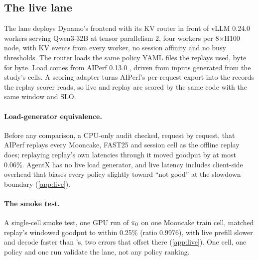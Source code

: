 \subsection{The live lane}
\label{sec:live-lane}

The lane deploys Dynamo's frontend with its KV router in front of vLLM 0.24.0 workers serving
Qwen3-32B at tensor parallelism 2, four workers per 8$\times$H100 node, with KV events from every
worker, no session affinity and no busy thresholds. The router loads the same policy YAML files the
replays used, byte for byte. Load comes from AIPerf 0.13.0 \citep{aiperf}, driven from inputs
generated from the study's cells. A scoring adapter turns AIPerf's per-request export into the
records the replay scorer reads, so live and replay are scored by the same code with the same window
and SLO.

\paragraph{Load-generator equivalence.}
Before any comparison, a CPU-only audit checked, request by request, that AIPerf replays every
Mooncake, FAST25 and session cell as the offline replay does; replaying replay's own latencies
through it moved goodput by at most 0.06\%. AgentX has no live load generator, and live latency
includes client-side overhead that biases every policy slightly toward ``not good'' at the
slowdown boundary (\cref{app:live}).

\paragraph{The smoke test.}
A single-cell smoke test, one GPU run of $\pi_{0}$ on one Mooncake train cell, matched replay's
windowed goodput to within 0.25\% (ratio 0.9976), with live prefill slower and decode faster than
\ais{}'s, two errors that offset there (\cref{app:live}). One cell, one policy and one run validate
the lane, not any policy ranking.

